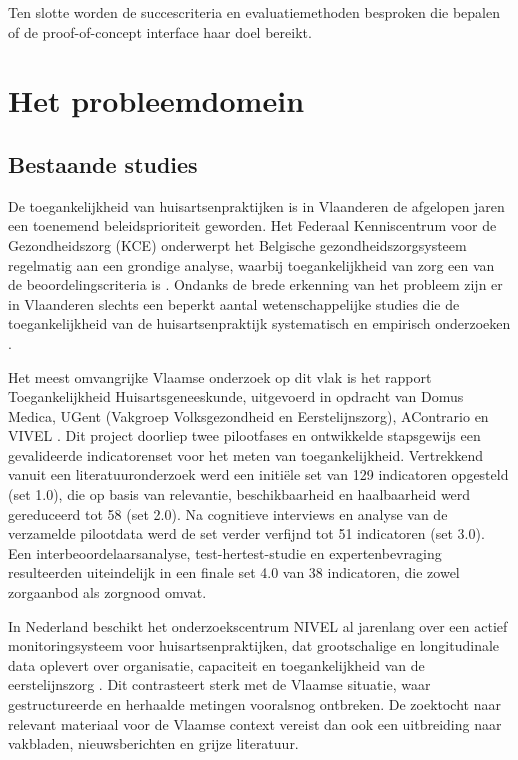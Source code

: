 Ten slotte worden de succescriteria en evaluatiemethoden
besproken die bepalen of de proof-of-concept interface haar doel bereikt.

\section{Het probleemdomein}
\label{sec:probleemdomein}

\subsection{Bestaande studies}
\label{subsec:bestaande-studies}

De toegankelijkheid van huisartsenpraktijken is in Vlaanderen de afgelopen jaren een
toenemend beleidsprioriteit geworden. Het Federaal Kenniscentrum voor de Gezondheidszorg
(KCE) onderwerpt het Belgische gezondheidszorgsysteem regelmatig aan een grondige analyse,
waarbij toegankelijkheid van zorg een van de beoordelingscriteria is \autocite{Merckx2023}.
Ondanks de brede erkenning van het probleem zijn er in Vlaanderen slechts een beperkt aantal
wetenschappelijke studies die de toegankelijkheid van de huisartsenpraktijk systematisch en
empirisch onderzoeken \autocite{Rampelberg2025}.
\medskip

Het meest omvangrijke Vlaamse onderzoek op dit vlak is het rapport Toegankelijkheid
Huisartsgeneeskunde, uitgevoerd in opdracht van Domus Medica, UGent (Vakgroep
Volksgezondheid en Eerstelijnszorg), AContrario en VIVEL \autocite{Merckx2023}. Dit project
doorliep twee pilootfases en ontwikkelde stapsgewijs een gevalideerde indicatorenset voor het
meten van toegankelijkheid. Vertrekkend vanuit een literatuuronderzoek werd een initiële set
van 129 indicatoren opgesteld (set 1.0), die op basis van relevantie, beschikbaarheid en
haalbaarheid werd gereduceerd tot 58 (set 2.0). Na cognitieve interviews en analyse van de
verzamelde pilootdata werd de set verder verfijnd tot 51 indicatoren (set 3.0). Een
interbeoordelaarsanalyse, test-hertest-studie en expertenbevraging resulteerden uiteindelijk in
een finale set 4.0 van 38 indicatoren, die zowel zorgaanbod als zorgnood omvat.
\medskip

In Nederland beschikt het onderzoekscentrum NIVEL al jarenlang over een actief
monitoringsysteem voor huisartsenpraktijken, dat grootschalige en longitudinale data oplevert
over organisatie, capaciteit en toegankelijkheid van de eerstelijnszorg \autocite{Rampelberg2025}.
Dit contrasteert sterk met de Vlaamse situatie, waar gestructureerde en herhaalde metingen
vooralsnog ontbreken. De zoektocht naar relevant materiaal voor de Vlaamse context vereist
dan ook een uitbreiding naar vakbladen, nieuwsberichten en grijze literatuur.

